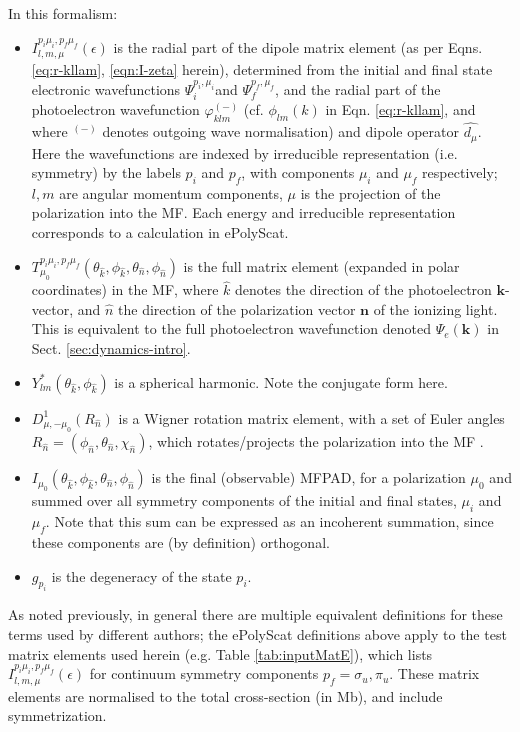 \documentclass[10pt]{article}
\begin{document}
In this formalism:
\begin{itemize}
\item $I_{l,m,\mu}^{p_{i}\mu_{i},p_{f}\mu_{f}}(\epsilon)$ is the radial part of the dipole matrix element (as per Eqns. \ref{eq:r-kllam}, \ref{eqn:I-zeta} herein), determined from the initial and final state electronic wavefunctions $\Psi_{i}^{p_{i},\mu_{i}}$and $\Psi_{f}^{p_{f},\mu_{f}}$,
and the radial part of the photoelectron wavefunction $\varphi_{klm}^{(-)}$ (cf. $\phi_{lm}(k)$ in Eqn. \ref{eq:r-kllam}, and where $^{(-)}$ denotes outgoing wave normalisation) and dipole operator $\hat{d_{\mu}}$. Here the wavefunctions are indexed by irreducible representation (i.e. symmetry) by the labels $p_{i}$ and $p_{f}$, with components $\mu_{i}$ and $\mu_{f}$ respectively; $l,m$ are angular momentum components, $\mu$ is the projection of the polarization into the MF. Each energy and irreducible representation corresponds to a calculation in ePolyScat.
\item $T_{\mu_{0}}^{p_{i}\mu_{i},p_{f}\mu_{f}}(\theta_{\hat{k}},\phi_{\hat{k}},\theta_{\hat{n}},\phi_{\hat{n}})$
is the full matrix element (expanded in polar coordinates) in the
MF, where $\hat{k}$ denotes the direction of the photoelectron $\mathbf{k}$-vector, and $\hat{n}$ the direction of the polarization vector $\mathbf{n}$ of the ionizing light. This is equivalent to the full photoelectron wavefunction denoted $\Psi_e(\mathbf{k})$ in Sect. \ref{sec:dynamics-intro}.
\item $Y_{lm}^{*}(\theta_{\hat{k}},\phi_{\hat{k}})$ is a spherical harmonic. Note the conjugate form here.
\item $D_{\mu,-\mu_{0}}^{1}(R_{\hat{n}})$ is a Wigner rotation matrix element, with a set of Euler angles $R_{\hat{n}}=(\phi_{\hat{n}},\theta_{\hat{n}},\chi_{\hat{n}})$, which rotates/projects the polarization into the MF .
\item $I_{\mu_{0}}(\theta_{\hat{k}},\phi_{\hat{k}},\theta_{\hat{n}},\phi_{\hat{n}})$ is the final (observable) MFPAD, for a polarization $\mu_{0}$ and summed over all symmetry components of the initial and final states, $\mu_{i}$ and $\mu_{f}$. Note that this sum can be expressed as an incoherent summation, since these components are (by definition) orthogonal.
\item $g_{p_{i}}$ is the degeneracy of the state $p_{i}$.
\end{itemize}

As noted previously, in general there are multiple equivalent definitions for these terms used by different authors; the ePolyScat definitions above apply to the test matrix elements used herein (e.g. Table \ref{tab:inputMatE}), which lists $I_{l,m,\mu}^{p_{i}\mu_{i},p_{f}\mu_{f}}(\epsilon)$ for continuum symmetry components $p_f=\sigma_u,\pi_u$. These matrix elements are normalised to the total cross-section (in Mb), and include symmetrization. 
\end{document}
